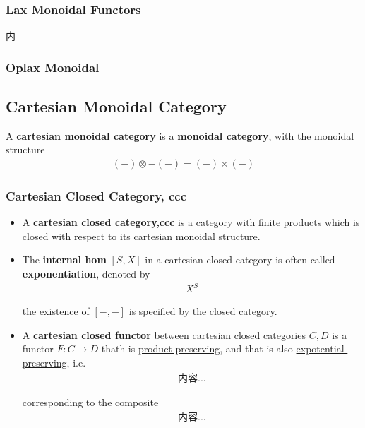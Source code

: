 \documentclass[Total.tex]{subfiles}
\begin{document}
			\subsubsection{Lax Monoidal Functors }
			
			\begin{Def}
				内
			\end{Def}
			
			\subsubsection{Oplax Monoidal}
			\subsection{Cartesian Monoidal Category}
			\begin{Def}
				A \textbf{cartesian monoidal category} is a \textbf{monoidal category}, with the monoidal structure
				\begin{gather*}
					(-)\otimes -(-)=(-)\times (-)
				\end{gather*}
			\end{Def}
			
			
			\subsubsection{Cartesian Closed Category, ccc}
			\begin{Def}
				\begin{itemize}
					\item 
					A \textbf{cartesian closed category,ccc} is a category with finite products which is closed with respect to its cartesian monoidal structure.
					
					\item The \textbf{internal hom} $[S,X]$ in a cartesian closed category is often called \textbf{exponentiation}, denoted by
					\begin{gather*}
						X^S
					\end{gather*}
					
					the existence of $[-,-]$ is specified by the closed category.
					\item A \textbf{cartesian closed functor} between cartesian closed categories $C,D$ is a functor $F:C\rightarrow D$ thath is \underline{product-preserving}, and that is also \underline{expotential-preserving}, i.e.
					\begin{gather*}
						内容...
					\end{gather*}
					
					corresponding to the composite
					\begin{gather*}
						内容...
					\end{gather*}
				\end{itemize}
			\end{Def}
			
\end{document}
